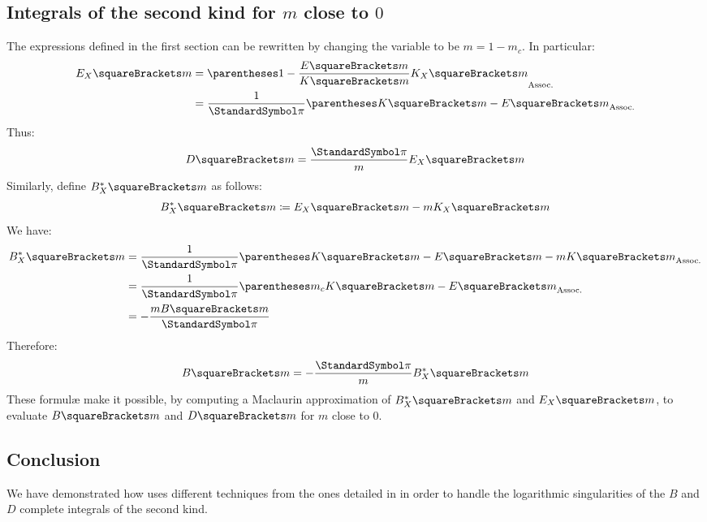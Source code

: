 \documentclass[10pt, a4paper, twoside]{basestyle}
\begin{document}
\subsection*{Integrals of the second kind for $m$ close to $0$}
The expressions defined in the first section can be rewritten by changing the variable to be $m = 1 - m_c$.  In particular:
\begin{align*}
E_X\of{m} &= \pa{1 - \frac{E\of{m}}{K\of{m}}K_X\of{m}}\\
&= \frac{1}{\Pi}\pa{K\of{m} - E\of{m}}
\end{align*}
Thus:
\[
D\of{m} = \frac{\Pi}{m}E_X\of{m}
\]
Similarly, define $B_X^*\of{m}$ as follows:
\[
B_X^*\of{m} \DefineAs E_X\of{m} - m K_X\of{m}
\]
We have:
\begin{align*}
B_X^*\of{m} &= \frac{1}{\Pi}\pa{K\of{m} - E\of{m} - m K\of{m}}\\
&= \frac{1}{\Pi}\pa{m_c K\of{m} - E\of{m}}\\
&= -\frac{m B\of{m}}{\Pi}
\end{align*}
Therefore:
\[
B\of{m} = -\frac{\Pi}{m} B_X^*\of{m}
\]
These formulæ make it possible, by computing a Maclaurin approximation of $B_X^*\of{m}$ and $E_X\of{m}$, to evaluate $B\of{m}$
and $D\of{m}$ for $m$ close to $0$.

\subsection*{Conclusion}
We have demonstrated how \cite{Fukushima2018} uses different techniques from the ones detailed in \cite{Fukushima2011a} in order to handle the 
logarithmic singularities of the $B$ and $D$ complete integrals of the second kind.
\printbibliography
\end{document}
